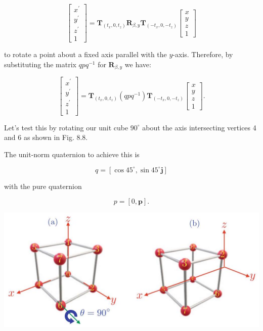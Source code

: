\documentclass[10pt]{article}
\begin{document}
$$
\left[\begin{array}{c}
x^{\prime} \\
y^{\prime} \\
z^{\prime} \\
1
\end{array}\right]=\mathbf{T}_{\left(t_{x}, 0, t_{z}\right)} \mathbf{R}_{\beta, y} \mathbf{T}_{\left(-t_{x}, 0,-t_{z}\right)}\left[\begin{array}{l}
x \\
y \\
z \\
1
\end{array}\right]
$$

to rotate a point about a fixed axis parallel with the $y$-axis. Therefore, by substituting the matrix $q p q^{-1}$ for $\mathbf{R}_{\beta, y}$ we have:

$$
\left[\begin{array}{c}
x^{\prime} \\
y^{\prime} \\
z^{\prime} \\
1
\end{array}\right]=\mathbf{T}_{\left(t_{x}, 0, t_{z}\right)}\left(q p q^{-1}\right) \mathbf{T}_{\left(-t_{x}, 0,-t_{z}\right)}\left[\begin{array}{l}
x \\
y \\
z \\
1
\end{array}\right] .
$$

Let's test this by rotating our unit cube $90^{\circ}$ about the axis intersecting vertices 4 and 6 as shown in Fig. 8.8.

The unit-norm quaternion to achieve this is

$$
q=\left[\cos 45^{\circ}, \sin 45^{\circ} \mathbf{j}\right]
$$

with the pure quaternion

$$
p=[0, \mathbf{p}] .
$$

\begin{center}
\includegraphics[max width=\textwidth]{2023_04_20_41f1ceac5a31dc7d1b59g-160}
\end{center}
\end{document}
